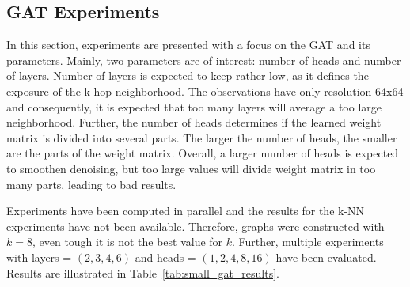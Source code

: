 \subsection{GAT Experiments}
In this section, experiments are presented with a focus on the GAT and its parameters.
Mainly, two parameters are of interest: number of heads and number of layers.
Number of layers is expected to keep rather low, as it defines the exposure of the k-hop neighborhood.
The observations have only resolution 64x64 and consequently, it is expected that too many layers will 
average a too large neighborhood.
Further, the number of heads determines if the learned weight matrix is divided into several parts.
The larger the number of heads, the smaller are the parts of the weight matrix.
Overall, a larger number of heads is expected to smoothen denoising, but too large values
will divide weight matrix in too many parts, leading to bad results.

Experiments have been computed in parallel and the results for the k-NN experiments have not been available. 
Therefore, graphs were constructed with $k=8$, even tough it is not the best value for $k$.
Further, multiple experiments with layers = $(2,3,4,6)$ and heads = $(1,2,4,8,16)$ have been evaluated.
Results are illustrated in Table~\ref{tab:small_gat_results}.

